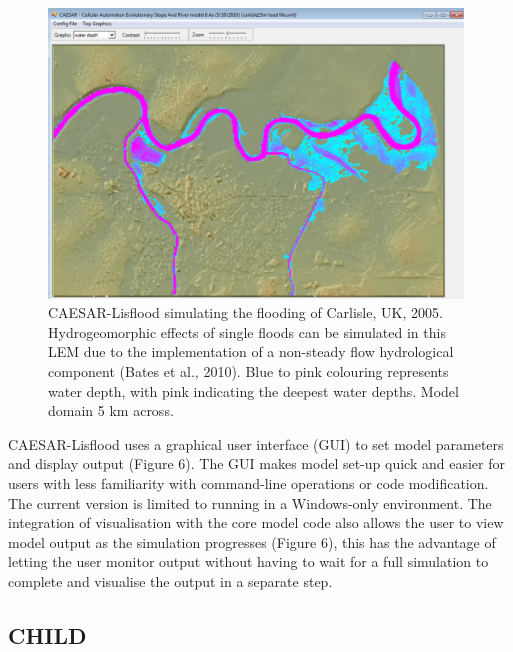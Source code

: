 \begin{figure}[t]
\includegraphics[width=11cm]{LEMFinalRevisedmanuscriptDAVFinalrevisions-img/LEMFinalRevisedmanuscriptDAVFinalrevisions-img007.png} 
\caption{CAESAR-Lisflood simulating the flooding of Carlisle, UK, 2005. Hydrogeomorphic effects of single floods can be simulated in this LEM due to the implementation of a non-steady flow hydrological component (Bates et al., 2010). Blue to pink colouring represents water depth, with pink indicating the deepest water depths. Model domain 5 km across.}
\label{fig_LEM_CAEASR_Lisflood}
\end{figure}

CAESAR-Lisflood uses a graphical user interface (GUI) to set model parameters and display output (Figure 6). The GUI makes model set-up quick and easier for users with less familiarity with command-line operations or code modification. The current version is limited to running in a Windows-only environment. The integration of visualisation with the core model code also allows the user to view model output as the simulation progresses (Figure 6), this has the advantage of letting the user monitor output without having to wait for a full simulation to complete and visualise the output in a separate step. 

\subsection{CHILD}

